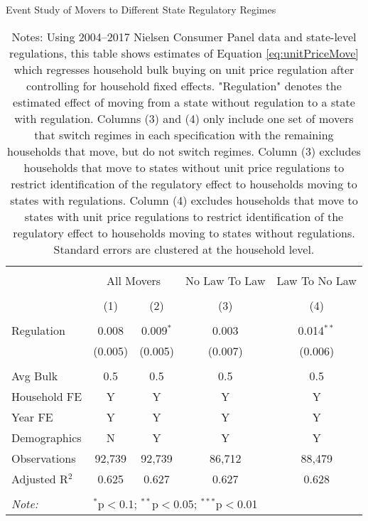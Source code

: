 \begin{table}[!htbp] \centering
  \caption{Event Study of Movers to Different State Regulatory Regimes}
  \label{tab:unitPriceLawMovers}
\begin{tabular}{@{\extracolsep{5pt}}lcccc}
\\[-1.8ex]\hline
\hline \\[-1.8ex]
 & \multicolumn{2}{c}{All Movers} & No Law To Law & Law To No Law \\
\\[-1.8ex] & (1) & (2) & (3) & (4)\\
\hline \\[-1.8ex]
 Regulation & 0.008 & 0.009$^{*}$ & 0.003 & 0.014$^{**}$ \\
  & (0.005) & (0.005) & (0.007) & (0.006) \\
 \hline \\[-1.8ex]
Avg Bulk & 0.5 & 0.5 & 0.5 & 0.5 \\
Household FE & Y & Y & Y & Y \\
Year FE & Y & Y & Y & Y \\
Demographics & N & Y & Y & Y \\
Observations & 92,739 & 92,739 & 86,712 & 88,479 \\
Adjusted R$^{2}$ & 0.625 & 0.627 & 0.627 & 0.628 \\
\hline
\hline \\[-1.8ex]
\textit{Note:}  & \multicolumn{4}{l}{$^{*}$p$<$0.1; $^{**}$p$<$0.05; $^{***}$p$<$0.01} \\
\end{tabular}
\caption*{Notes: Using 2004--2017 Nielsen Consumer Panel data and state-level regulations, this table shows estimates of Equation \ref{eq:unitPriceMove} which regresses household bulk buying on unit price regulation after controlling for household fixed effects. "Regulation" denotes the estimated effect of moving from a state without regulation to a state with regulation. Columns (3) and (4) only include one set of movers that switch regimes in each specification with the remaining households that move, but do not switch regimes. Column (3) excludes households that move to states without unit price regulations to restrict identification of the regulatory effect to households moving to states with regulations. Column (4) excludes households that move to states with unit price regulations to restrict identification of the regulatory effect to households moving to states without regulations. Standard errors are clustered at the household level.}
\end{table}

